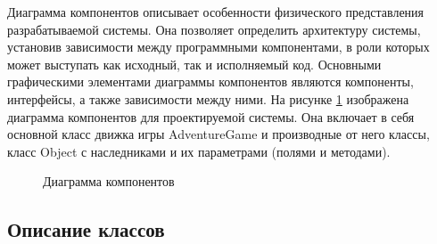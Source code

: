 Диаграмма компонентов описывает особенности физического представления разрабатываемой системы. Она позволяет определить архитектуру системы, установив зависимости между программными компонентами, в роли которых может выступать как исходный, так и исполняемый код. Основными графическими элементами диаграммы компонентов являются компоненты, интерфейсы, а также зависимости между ними. На рисунке \ref{diagram:image} изображена диаграмма компонентов для проектируемой системы. Она включает в себя основной класс движка игры AdventureGame и производные от него классы, класс Object с наследниками и их параметрами (полями и методами).

\begin{figure}[ht]
\caption{Диаграмма компонентов}
\label{diagram:image}
\end{figure}

\subsection{Описание классов}

